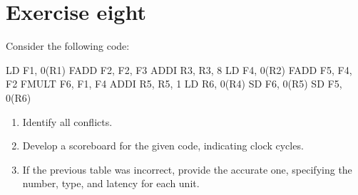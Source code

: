 \section{Exercise eight}

Consider the following code:
\begin{verbnobox}[\verbarg]
LD F1, 0(R1)
FADD F2, F2, F3
ADDI R3, R3, 8
LD F4, 0(R2)
FADD F5, F4, F2
FMULT F6, F1, F4
ADDI R5, R5, 1
LD R6, 0(R4)
SD F6, 0(R5)
SD F5, 0(R6)
\end{verbnobox}
\begin{enumerate}
    \item Identify all conflicts.
    \item Develop a scoreboard for the given code, indicating clock cycles.
    \item If the previous table was incorrect, provide the accurate one, specifying the number, type, and latency for each unit.
\end{enumerate}

